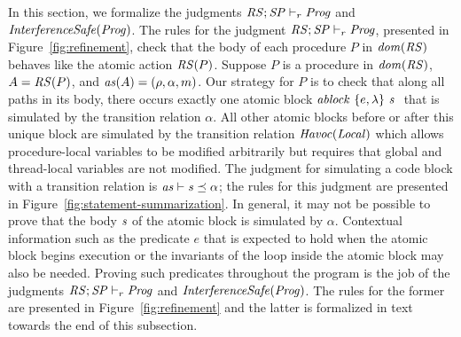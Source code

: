 In this section, we formalize the judgments $\mathit{RS};\mathit{SP} \vdash_r \mathit{Prog}$ and $\mathit{InterferenceSafe}(\mathit{Prog})$.
The rules for the judgment $\mathit{RS};\mathit{SP} \vdash_r \mathit{Prog}$, presented in Figure~\ref{fig:refinement}, check that the body of 
each procedure $P$ in $\mathit{dom}(\mathit{RS})$ behaves like the atomic action $\mathit{RS}(P)$.  
Suppose $P$ is a procedure in $\mathit{dom}(\mathit{RS})$, $A = \mathit{RS}(P)$, and $\mathit{as}(A) = (\rho, \alpha, m)$.
Our strategy for $P$ is to check that along all paths in its body, there occurs exactly one atomic block 
$\mathit{ablock}\ {\{e,\lambda\}}\ {\mathit{s}}\ $ that is simulated by the transition relation $\alpha$.
All other atomic blocks before or after this unique block are simulated by the transition relation $\mathit{Havoc}(\mathit{Local})$ 
which allows procedure-local variables to be modified arbitrarily but requires that global and thread-local variables are not modified.
The judgment for simulating a code block with a transition relation is $\mathit{as} \vdash \mathit{s} \preceq \alpha$; the rules for this judgment 
are presented in Figure~\ref{fig:statement-summarization}.
In general, it may not be possible to prove that the body $\mathit{s}$ of the atomic block is simulated by $\alpha$.
Contextual information such as the predicate $e$ that is expected to hold when the atomic block begins execution or the invariants
of the loop inside the atomic block may also be needed.
Proving such predicates throughout the program is the job of the judgments $\mathit{RS};\mathit{SP} \vdash_r \mathit{Prog}$ and $\mathit{InterferenceSafe}(\mathit{Prog})$.
The rules for the former are presented in Figure~\ref{fig:refinement} and the latter is formalized in text towards the end of this 
subsection.

